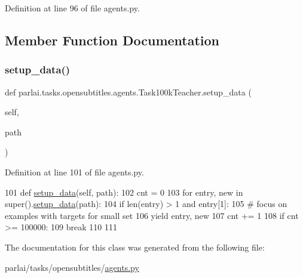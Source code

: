 Definition at line 96 of file agents.\+py.



\subsection{Member Function Documentation}
\mbox{\label{classparlai_1_1tasks_1_1opensubtitles_1_1agents_1_1Task100kTeacher_ac1bceba11d526547b201f29a15427deb}} 
\subsubsection{\texorpdfstring{setup\+\_\+data()}{setup\_data()}}
{\footnotesize\ttfamily def parlai.\+tasks.\+opensubtitles.\+agents.\+Task100k\+Teacher.\+setup\+\_\+data (\begin{DoxyParamCaption}\item[{}]{self,  }\item[{}]{path }\end{DoxyParamCaption})}



Definition at line 101 of file agents.\+py.


\begin{DoxyCode}
101     \textcolor{keyword}{def }\hyperlink{namespaceparlai_1_1tasks_1_1multinli_1_1agents_a4fa2cb0ba1ed745336ad8bceed36b841}{setup\_data}(self, path):
102         cnt = 0
103         \textcolor{keywordflow}{for} entry, new \textcolor{keywordflow}{in} super().\hyperlink{namespaceparlai_1_1tasks_1_1multinli_1_1agents_a4fa2cb0ba1ed745336ad8bceed36b841}{setup\_data}(path):
104             \textcolor{keywordflow}{if} len(entry) > 1 \textcolor{keywordflow}{and} entry[1]:
105                 \textcolor{comment}{# focus on examples with targets for small set}
106                 \textcolor{keywordflow}{yield} entry, new
107             cnt += 1
108             \textcolor{keywordflow}{if} cnt >= 100000:
109                 \textcolor{keywordflow}{break}
110 
111 
\end{DoxyCode}


The documentation for this class was generated from the following file\+:\begin{DoxyCompactItemize}
\item 
parlai/tasks/opensubtitles/\hyperlink{parlai_2tasks_2opensubtitles_2agents_8py}{agents.\+py}\end{DoxyCompactItemize}
